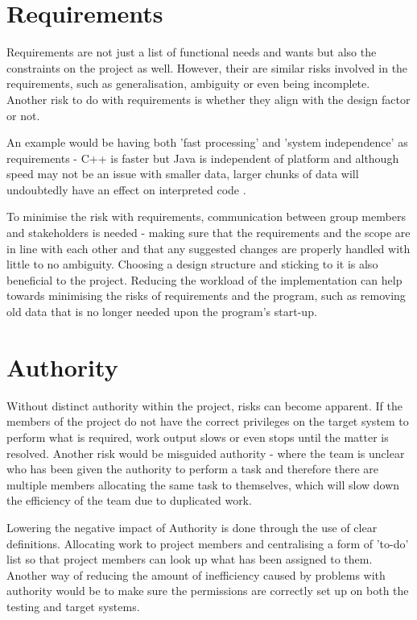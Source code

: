 \section{Requirements}
Requirements are not just a list of functional needs and wants but also the
constraints on the project as well.  However, their are similar risks involved
in the requirements, such as generalisation, ambiguity or even being incomplete.
Another risk to do with requirements is whether they align with the design
factor or not.

An example would be having both 'fast processing' and 'system
independence' as requirements - C++ is faster but Java is independent of
platform and although speed may not be an issue with smaller data, larger chunks
of data will undoubtedly have an effect on interpreted code
\cite{javaCbenchmark}.

To minimise the risk with requirements, communication between group members and
stakeholders is needed - making sure that the requirements and the scope are in
line with each other and that any suggested changes are properly handled with
little to no ambiguity.  Choosing a design structure and sticking to it is also
beneficial to the project.  Reducing the workload of the implementation can
help towards minimising the risks of requirements and the program, such as
removing old data that is no longer needed upon the program's start-up.

\section{Authority}
Without distinct authority within the project, risks can become apparent.
If the members of the project do not have the correct privileges on the target
system to perform what is required, work output slows or even stops until the
matter is resolved.  Another risk would be misguided authority - where the team
is unclear who has been given the authority to perform a task and therefore 
there are multiple members allocating the same task to themselves, which will
slow down the efficiency of the team due to duplicated work.

Lowering the negative impact of Authority is done through the use of clear
definitions.  Allocating work to project members and centralising a form of
'to-do' list so that project members can look up what has been assigned to them.
Another way of reducing the amount of inefficiency caused by problems with
authority would be to make sure the permissions are correctly set up on both the
testing and target systems.

